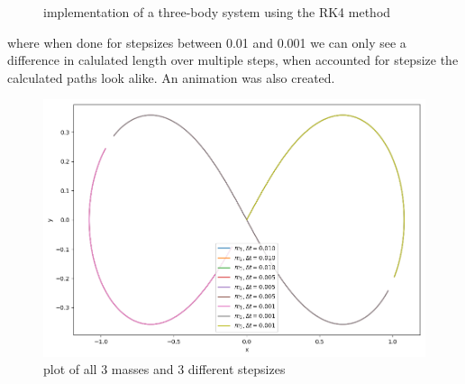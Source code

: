 \documentclass[11pt, a4paper, reqno]{scrartcl}
\begin{document}
        \begin{figure}[H]
            
        \end{figure}
        \begin{figure}[H]
            
            \caption{implementation of a three-body system using the RK4 method}
        \end{figure}
        where when done for stepsizes between 0.01 and 0.001 we can only see a difference in calulated length over multiple steps, when accounted for stepsize the calculated paths look alike. 
        An animation was also created.
        \begin{landscape}
            \begin{figure}
                \includegraphics[width=\paperwidth]{3-21-plot}
                \caption{plot of all 3 masses and 3 different stepsizes}
            \end{figure}
        \end{landscape}
        
        
\end{document}
